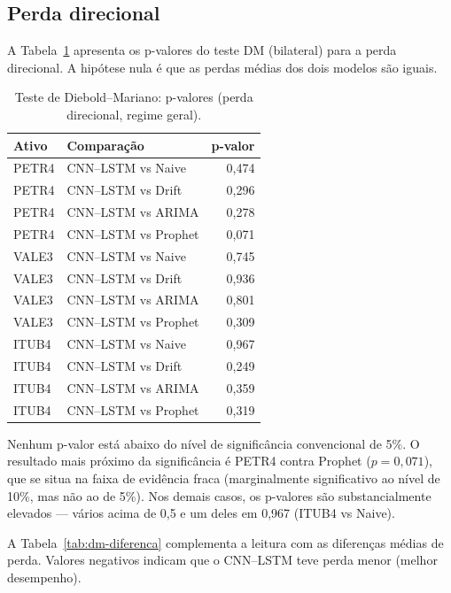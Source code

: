 \subsection{Perda direcional}

A Tabela~\ref{tab:dm-resumo} apresenta os p-valores do teste DM (bilateral) para a perda
direcional. A hipótese nula é que as perdas médias dos dois modelos são iguais.

\begin{table}[htbp]
  \centering
  \caption{Teste de Diebold--Mariano: p-valores (perda direcional, regime geral).}
  \label{tab:dm-resumo}
  \begin{tabular}{l l r}
    \toprule
    \textbf{Ativo} & \textbf{Comparação} & \textbf{p-valor} \\
    \midrule
    PETR4 & CNN--LSTM vs Naive   & 0,474 \\
    PETR4 & CNN--LSTM vs Drift   & 0,296 \\
    PETR4 & CNN--LSTM vs ARIMA   & 0,278 \\
    PETR4 & CNN--LSTM vs Prophet & 0,071 \\
    \midrule
    VALE3 & CNN--LSTM vs Naive   & 0,745 \\
    VALE3 & CNN--LSTM vs Drift   & 0,936 \\
    VALE3 & CNN--LSTM vs ARIMA   & 0,801 \\
    VALE3 & CNN--LSTM vs Prophet & 0,309 \\
    \midrule
    ITUB4 & CNN--LSTM vs Naive   & 0,967 \\
    ITUB4 & CNN--LSTM vs Drift   & 0,249 \\
    ITUB4 & CNN--LSTM vs ARIMA   & 0,359 \\
    ITUB4 & CNN--LSTM vs Prophet & 0,319 \\
    \bottomrule
  \end{tabular}
\end{table}

Nenhum p-valor está abaixo do nível de significância convencional de 5\%.
O resultado mais próximo da significância é PETR4 contra Prophet ($p = 0{,}071$),
que se situa na faixa de evidência fraca (marginalmente significativo ao nível de 10\%,
mas não ao de 5\%). Nos demais casos, os p-valores são substancialmente elevados ---
vários acima de 0,5 e um deles em 0,967 (ITUB4 vs Naive).

A Tabela~\ref{tab:dm-diferenca} complementa a leitura com as diferenças médias de perda.
Valores negativos indicam que o CNN--LSTM teve perda menor (melhor desempenho).

